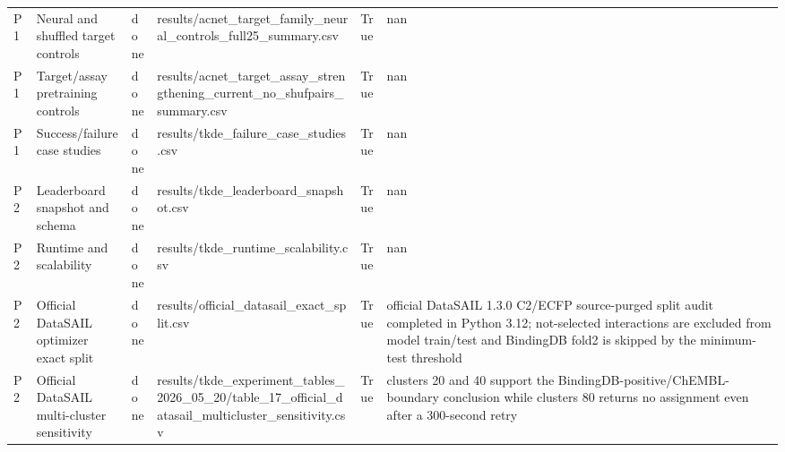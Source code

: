 \begin{table}[!t]
\begin{tabular}{llllll}
P1 & Neural and shuffled target controls & done & results/acnet\_target\_family\_neural\_controls\_full25\_summary.csv & True & nan \\
P1 & Target/assay pretraining controls & done & results/acnet\_target\_assay\_strengthening\_current\_no\_shufpairs\_summary.csv & True & nan \\
P1 & Success/failure case studies & done & results/tkde\_failure\_case\_studies.csv & True & nan \\
P2 & Leaderboard snapshot and schema & done & results/tkde\_leaderboard\_snapshot.csv & True & nan \\
P2 & Runtime and scalability & done & results/tkde\_runtime\_scalability.csv & True & nan \\
P2 & Official DataSAIL optimizer exact split & done & results/official\_datasail\_exact\_split.csv & True & official DataSAIL 1.3.0 C2/ECFP source-purged split audit completed in Python 3.12; not-selected interactions are excluded from model train/test and BindingDB fold2 is skipped by the minimum-test threshold \\
P2 & Official DataSAIL multi-cluster sensitivity & done & results/tkde\_experiment\_tables\_2026\_05\_20/table\_17\_official\_datasail\_multicluster\_sensitivity.csv & True & clusters 20 and 40 support the BindingDB-positive/ChEMBL-boundary conclusion while clusters 80 returns no assignment even after a 300-second retry \\
\bottomrule
\end{tabular}
\end{table}
